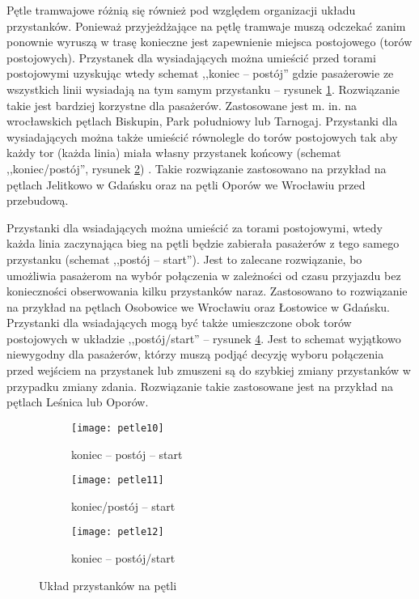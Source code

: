 \documentclass[twoside,12pt]{article}
\begin{document}
	Pętle tramwajowe różnią się również pod względem organizacji układu przystanków. Ponieważ przyjeżdżające na pętlę tramwaje muszą odczekać zanim ponownie wyruszą w trasę konieczne jest zapewnienie miejsca postojowego (torów postojowych). Przystanek dla wysiadających można umieścić przed torami postojowymi uzyskując wtedy schemat ,,koniec -- postój'' gdzie pasażerowie ze wszystkich linii wysiadają na tym samym przystanku -- rysunek \ref{petle4a}. Rozwiązanie takie jest bardziej korzystne dla pasażerów. Zastosowane jest m. in. na wrocławskich pętlach Biskupin, Park południowy lub Tarnogaj. Przystanki dla wysiadających można także umieścić równolegle do torów postojowych tak aby każdy tor (każda linia) miała własny przystanek końcowy (schemat ,,koniec\slash postój'', rysunek \ref{petle4b}) . Takie rozwiązanie zastosowano na przykład na pętlach Jelitkowo w Gdańsku oraz na pętli Oporów we Wrocławiu przed przebudową. 
	
	Przystanki dla wsiadających można umieścić za torami postojowymi, wtedy każda linia zaczynająca bieg na pętli będzie zabierała pasażerów z tego samego przystanku (schemat ,,postój -- start''). Jest to zalecane rozwiązanie, bo umożliwia pasażerom na wybór połączenia w zależności od czasu przyjazdu bez konieczności obserwowania kilku przystanków naraz. Zastosowano to rozwiązanie na przykład na pętlach Osobowice we Wrocławiu oraz Łostowice w Gdańsku. Przystanki dla wsiadających mogą być także umieszczone obok torów postojowych w układzie ,,postój\slash start'' -- rysunek \ref{petle4c}. Jest to schemat wyjątkowo niewygodny dla pasażerów, którzy muszą podjąć decyzję wyboru połączenia przed wejściem na przystanek lub zmuszeni są do szybkiej zmiany przystanków w przypadku zmiany zdania. Rozwiązanie takie zastosowane jest na przykład na pętlach Leśnica lub Oporów. 
	
		\begin{figure}[H]
	\centering
	\begin{subfigure}{.33\textwidth}
	  \centering
	  \texttt{[image: petle10]}
	  \caption{koniec -- postój -- start}
	  \label{petle4a}
	\end{subfigure}%
	\begin{subfigure}{.33\textwidth}
	  \centering
	  \texttt{[image: petle11]}
	  \caption{koniec\slash postój -- start}
	  \label{petle4b}
	\end{subfigure}%
	\begin{subfigure}{.33\textwidth}
	  \centering
	  \texttt{[image: petle12]}
	  \caption{koniec -- postój\slash start}
	  \label{petle4c}
	\end{subfigure}
	\caption{Układ przystanków na pętli}	
	\end{figure}
	
\end{document}

